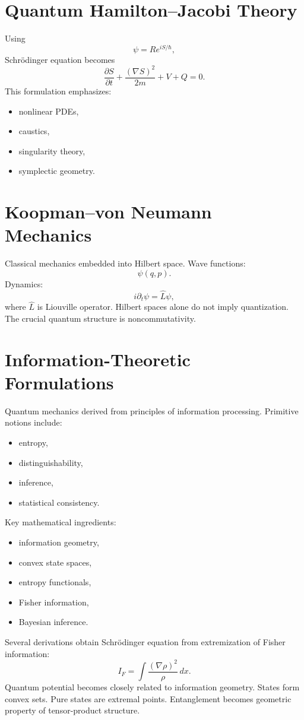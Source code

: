 \section{Quantum Hamilton--Jacobi Theory}
\label{qmf:hj}
Using
\[\psi = Re^{iS/\hbar},\]
Schr\"odinger equation becomes
\[\frac{\partial S}{\partial t}+
\frac{(\nabla S)^2}{2m}+V+Q=0.\]
This formulation emphasizes:
\begin{itemize}
\item nonlinear PDEs,
\item caustics,
\item singularity theory,
\item symplectic geometry.
\end{itemize}

\section{Koopman--von Neumann Mechanics}
\label{qmf:kn}
Classical mechanics embedded into Hilbert space.
Wave functions:
\[\psi(q,p).\]
Dynamics:
\[i\partial_t \psi=\hat L \psi,\]
where $\hat L$ is Liouville operator.
Hilbert spaces alone do not imply quantization.
The crucial quantum structure is noncommutativity.

\section{Information-Theoretic Formulations}
\label{qmf:it}
Quantum mechanics derived from principles of information processing.
Primitive notions include:
\begin{itemize}
\item entropy,
\item distinguishability,
\item inference,
\item statistical consistency.
\end{itemize}
Key mathematical ingredients:
\begin{itemize}
\item information geometry,
\item convex state spaces,
\item entropy functionals,
\item Fisher information,
\item Bayesian inference.
\end{itemize}
Several derivations obtain Schr\"odinger equation from extremization of Fisher information:
\[I_F=\int\frac{(\nabla \rho)^2}{\rho}\,dx.\]
Quantum potential becomes closely related to information geometry.
States form convex sets.
Pure states are extremal points.
Entanglement becomes geometric property of tensor-product structure.

